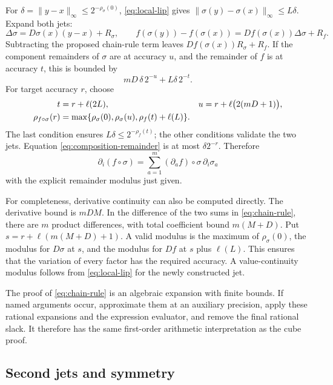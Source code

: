 For $\delta=\|y-x\|_\infty\le2^{-\rho_\sigma(0)}$,
\eqref{eq:local-lip} gives $\|\sigma(y)-\sigma(x)\|_\infty\le L\delta$.
Expand both jets:
\[
 \Delta\sigma=D\sigma(x)(y-x)+R_\sigma,\qquad
 f(\sigma(y))-f(\sigma(x))
   =Df(\sigma(x))\Delta\sigma+R_f.
\]
Subtracting the proposed chain-rule term leaves
$Df(\sigma(x))R_\sigma+R_f$. If the component remainders of $\sigma$
are at accuracy $u$, and the remainder of $f$ is at accuracy $t$, this
is bounded by
\begin{equation}\label{eq:composition-remainder}
 mD\,\delta\,2^{-u}+L\delta\,2^{-t}.
\end{equation}
For target accuracy $r$, choose
\begin{align}
 t&=r+\ell(2L),&
 u&=r+\ell\bigl(2(mD+1)\bigr),\notag\\
 \rho_{f\circ\sigma}(r)
 &=\max\{\rho_\sigma(0),\rho_\sigma(u),
                     \rho_f(t)+\ell(L)\}.
 \label{eq:composition-modulus}
\end{align}
The last condition ensures $L\delta\le2^{-\rho_f(t)}$; the other
conditions validate the two jets. Equation
\eqref{eq:composition-remainder} is at most $\delta2^{-r}$. Therefore
\begin{equation}\label{eq:chain-rule}
 \partial_i(f\circ\sigma)
 =\sum_{a=1}^m(\partial_af)\circ\sigma\,\partial_i\sigma_a
\end{equation}
with the explicit remainder modulus just given.

For completeness, derivative continuity can also be computed directly.
The derivative bound is $mDM$. In the difference of the two sums in
\eqref{eq:chain-rule}, there are $m$ product differences, with total
coefficient bound $m(M+D)$. Put
$s=r+\ell(m(M+D)+1)$. A valid modulus is the maximum of
$\rho_\sigma(0)$, the modulus for $D\sigma$ at $s$, and
the modulus for $Df$ at $s$ plus $\ell(L)$. This ensures that the
variation of every factor has the required accuracy. A value-continuity
modulus follows from \eqref{eq:local-lip} for the newly constructed jet.

The proof of \eqref{eq:chain-rule} is an algebraic expansion with finite
bounds. If named arguments occur, approximate them at an auxiliary
precision, apply these rational expansions and the expression evaluator,
and remove the final rational slack. It therefore has the same
first-order arithmetic interpretation as the cube proof.

\subsection{Second jets and symmetry}

